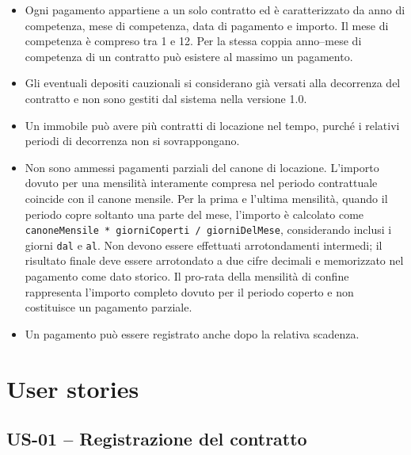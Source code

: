 \documentclass[12pt,a4paper]{article}
\begin{document}
\begin{itemize}
          già versata e il sistema deve creare e memorizzare il relativo pagamento con anno e mese
          di competenza corrispondenti alla decorrenza e data di pagamento coincidente con la data
          \texttt{dal}. Se la decorrenza non coincide con il primo giorno del mese, l'importo della
          prima mensilità è calcolato in proporzione ai giorni compresi tra \texttt{dal} e l'ultimo
          giorno del mese, estremi inclusi. Le successive registrazioni di pagamento della versione
          1.0 riguardano pertanto le mensilità successive alla prima.
    \item Ogni pagamento appartiene a un solo contratto ed è caratterizzato da anno di competenza,
          mese di competenza, data di pagamento e importo. Il mese di competenza è compreso tra 1 e 12.
          Per la stessa coppia anno--mese di competenza di un contratto può esistere al massimo un pagamento.
    \item Gli eventuali depositi cauzionali si considerano già versati alla decorrenza
          del contratto e non sono gestiti dal sistema nella versione 1.0.
    \item Un immobile può avere più contratti di locazione nel tempo, purché i relativi
          periodi di decorrenza non si sovrappongano.
    \item Non sono ammessi pagamenti parziali del canone di locazione. L'importo dovuto per una
          mensilità interamente compresa nel periodo contrattuale coincide con il canone mensile.
          Per la prima e l'ultima mensilità, quando il periodo copre soltanto una parte del mese,
          l'importo è calcolato come \texttt{canoneMensile * giorniCoperti / giorniDelMese},
          considerando inclusi i giorni \texttt{dal} e \texttt{al}. Non devono essere effettuati
          arrotondamenti intermedi; il risultato finale deve essere arrotondato a due cifre decimali
          e memorizzato nel pagamento come dato storico. Il pro-rata della mensilità di confine
          rappresenta l'importo completo dovuto per il periodo coperto e non costituisce un pagamento parziale.
    \item Un pagamento può essere registrato anche dopo la relativa scadenza.
\end{itemize}

\section{User stories}

\subsection{US-01 -- Registrazione del contratto}
\end{document}
